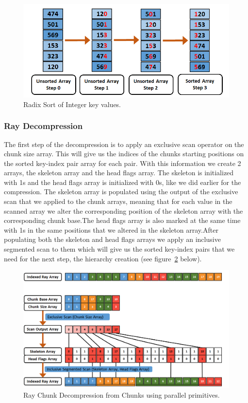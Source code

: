 \documentclass{llncs}
\begin{document}
\begin{figure}
\centering
\includegraphics[scale=0.50]{images/figure 14.png}
\caption{Radix Sort of Integer key values.}
\label{fig:ray-sorting}
\end{figure}

%
\subsubsection{Ray Decompression}
%

The first step of the decompression is to apply an exclusive scan operator on the chunk size array. This will give us the indices of the chunks starting positions on the sorted key-index pair array for each pair. With this information we create 2 arrays, the skeleton array and the head flags array. The skeleton is initialized with 1s and the head flags array is initialized with 0s, like we did earlier for the compression. The skeleton array is populated using the output of the exclusive scan that we applied to the chunk arrays, meaning that for each value in the scanned array we alter the corresponding position of the skeleton array with the corresponding chunk base.The head flags array is also marked at the same time with 1s in the same positions that we altered in the skeleton array.After populating both the skeleton and head flags arrays we apply an inclusive segmented scan to them which will give us the sorted key-index pairs that we need for the next step, the hierarchy creation (see figure~\ref{fig:ray-decompression} below).

\begin{figure}
\centering
\includegraphics[scale=0.45]{images/figure 11.png}
\caption{Ray Chunk Decompression from Chunks using parallel primitives.}
\label{fig:ray-decompression}
\end{figure}
\end{document}
